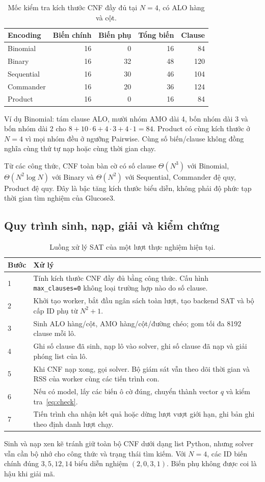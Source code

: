 \begin{table}[pos=H]\centering\small
\caption{Mốc kiểm tra kích thước CNF đầy đủ tại $N=4$, có ALO hàng và cột.}
\begin{tabular}{@{}lrrrr@{}}\toprule
Encoding & Biến chính & Biến phụ & Tổng biến & Clause\\\midrule
Binomial & 16&0&16&84\\
Binary & 16&32&48&120\\
Sequential & 16&30&46&104\\
Commander & 16&20&36&124\\
Product & 16&0&16&84\\
\bottomrule\end{tabular}
\end{table}
Ví dụ Binomial: tám clause ALO, mười nhóm AMO dài 4, bốn nhóm dài 3 và bốn nhóm dài 2 cho $8+10\cdot6+4\cdot3+4\cdot1=84$. Product có cùng kích thước ở $N=4$ vì mọi nhóm đều ở ngưỡng Pairwise. Cùng số biến/clause không đồng nghĩa cùng thứ tự nạp hoặc cùng thời gian chạy.

Từ các công thức, CNF toàn bàn cờ có số clause $\Theta(N^3)$ với Binomial, $\Theta(N^2\log N)$ với Binary và $\Theta(N^2)$ với Sequential, Commander đệ quy, Product đệ quy. Đây là bậc tăng kích thước biểu diễn, không phải độ phức tạp thời gian tìm nghiệm của Glucose3.

\subsection{Quy trình sinh, nạp, giải và kiểm chứng}
\begin{table}[pos=H]\centering\small
\caption{Luồng xử lý SAT của một lượt thực nghiệm hiện tại.}
\label{tab:sat-process}
\begin{tabular}{@{}p{.08\linewidth}p{.85\linewidth}@{}}\toprule
Bước & Xử lý\\\midrule
1 & Tính kích thước CNF đầy đủ bằng công thức. Cấu hình \texttt{max\_clauses=0} không loại trường hợp nào do số clause.\\
2 & Khởi tạo worker, bắt đầu ngân sách toàn lượt, tạo backend SAT và bộ cấp ID phụ từ $N^2+1$.\\
3 & Sinh ALO hàng/cột, AMO hàng/cột/đường chéo; gom tối đa 8192 clause mỗi lô.\\
4 & Ghi số clause đã sinh, nạp lô vào solver, ghi số clause đã nạp và giải phóng list của lô.\\
5 & Khi CNF nạp xong, gọi solver. Bộ giám sát vẫn theo dõi thời gian và RSS của worker cùng các tiến trình con.\\
6 & Nếu có model, lấy các biến ô cờ đúng, chuyển thành vector $q$ và kiểm tra~\eqref{eq:check}.\\
7 & Tiến trình cha nhận kết quả hoặc dừng lượt vượt giới hạn, ghi bản ghi theo định danh lượt chạy.\\
\bottomrule\end{tabular}
\end{table}
Sinh và nạp xen kẽ tránh giữ toàn bộ CNF dưới dạng list Python, nhưng solver vẫn cần bộ nhớ cho công thức và trạng thái tìm kiếm. Với $N=4$, các ID biến chính đúng $3,5,12,14$ biểu diễn nghiệm $(2,0,3,1)$. Biến phụ không được coi là hậu khi giải mã.


